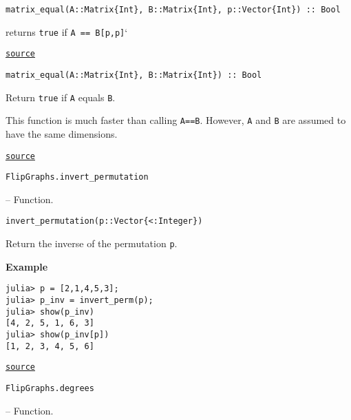\begin{adjustwidth}{2em}{0pt}


\begin{verbatim}
matrix_equal(A::Matrix{Int}, B::Matrix{Int}, p::Vector{Int}) :: Bool
\end{verbatim}

returns \texttt{true} if \texttt{A == B[p,p]}`



\href{https://github.com/schto223/FlipGraphs.jl/blob/e35d43698a06b86273148826b79d585ba04fcd26/src/generalUtilities.jl#L201-L205}{\texttt{source}}



\begin{verbatim}
matrix_equal(A::Matrix{Int}, B::Matrix{Int}) :: Bool
\end{verbatim}

Return \texttt{true} if \texttt{A} equals \texttt{B}. 

This function is much faster than calling \texttt{A==B}. However, \texttt{A} and \texttt{B} are assumed to have the same dimensions.



\href{https://github.com/schto223/FlipGraphs.jl/blob/e35d43698a06b86273148826b79d585ba04fcd26/src/generalUtilities.jl#L217-L223}{\texttt{source}}


\end{adjustwidth}
\hypertarget{8511433467110044213}{\texttt{FlipGraphs.invert\_permutation}}  -- {Function.}

\begin{adjustwidth}{2em}{0pt}


\begin{verbatim}
invert_permutation(p::Vector{<:Integer})
\end{verbatim}

Return the inverse of the permutation \texttt{p}. 

\textbf{Example}


\begin{verbatim}
julia> p = [2,1,4,5,3];
julia> p_inv = invert_perm(p); 
julia> show(p_inv)
[4, 2, 5, 1, 6, 3]
julia> show(p_inv[p])
[1, 2, 3, 4, 5, 6]
\end{verbatim}



\href{https://github.com/schto223/FlipGraphs.jl/blob/e35d43698a06b86273148826b79d585ba04fcd26/src/generalUtilities.jl#L169-L183}{\texttt{source}}


\end{adjustwidth}
\hypertarget{7908214606729723836}{\texttt{FlipGraphs.degrees}}  -- {Function.}


